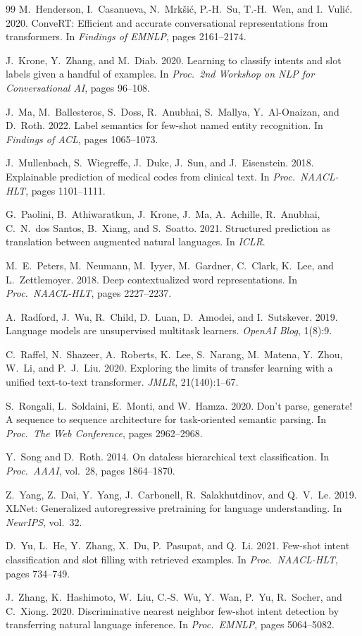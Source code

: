 \documentclass[11pt]{article}
\begin{document}
\begin{thebibliography}{99}
 M.~Henderson, I.~Casanueva, N.~Mrk\v{s}i\'c,
P.-H.~Su, T.-H.~Wen, and I.~Vuli\'c. 2020. ConveRT: Efficient and accurate
conversational representations from transformers. In \emph{Findings of
EMNLP}, pages 2161--2174.

 J.~Krone, Y.~Zhang, and M.~Diab. 2020. Learning to
classify intents and slot labels given a handful of examples. In \emph{Proc.\
2nd Workshop on NLP for Conversational AI}, pages 96--108.

 J.~Ma, M.~Ballesteros, S.~Doss, R.~Anubhai, S.~Mallya,
Y.~Al-Onaizan, and D.~Roth. 2022. Label semantics for few-shot named entity
recognition. In \emph{Findings of ACL}, pages 1065--1073.

 J.~Mullenbach, S.~Wiegreffe, J.~Duke, J.~Sun, and
J.~Eisenstein. 2018. Explainable prediction of medical codes from clinical
text. In \emph{Proc.\ NAACL-HLT}, pages 1101--1111.

 G.~Paolini, B.~Athiwaratkun, J.~Krone, J.~Ma,
A.~Achille, R.~Anubhai, C.~N.~dos Santos, B.~Xiang, and S.~Soatto. 2021.
Structured prediction as translation between augmented natural languages. In
\emph{ICLR}.

 M.~E.~Peters, M.~Neumann, M.~Iyyer, M.~Gardner,
C.~Clark, K.~Lee, and L.~Zettlemoyer. 2018. Deep contextualized word
representations. In \emph{Proc.\ NAACL-HLT}, pages 2227--2237.

 A.~Radford, J.~Wu, R.~Child, D.~Luan, D.~Amodei, and
I.~Sutskever. 2019. Language models are unsupervised multitask learners.
\emph{OpenAI Blog}, 1(8):9.

 C.~Raffel, N.~Shazeer, A.~Roberts, K.~Lee, S.~Narang,
M.~Matena, Y.~Zhou, W.~Li, and P.~J.~Liu. 2020. Exploring the limits of
transfer learning with a unified text-to-text transformer. \emph{JMLR},
21(140):1--67.

 S.~Rongali, L.~Soldaini, E.~Monti, and W.~Hamza. 2020.
Don't parse, generate! A sequence to sequence architecture for task-oriented
semantic parsing. In \emph{Proc.\ The Web Conference}, pages 2962--2968.

 Y.~Song and D.~Roth. 2014. On dataless hierarchical text
classification. In \emph{Proc.\ AAAI}, vol.\ 28, pages 1864--1870.

 Z.~Yang, Z.~Dai, Y.~Yang, J.~Carbonell, R.~Salakhutdinov,
and Q.~V.~Le. 2019. XLNet: Generalized autoregressive pretraining for
language understanding. In \emph{NeurIPS}, vol.\ 32.

 D.~Yu, L.~He, Y.~Zhang, X.~Du, P.~Pasupat, and Q.~Li. 2021.
Few-shot intent classification and slot filling with retrieved examples. In
\emph{Proc.\ NAACL-HLT}, pages 734--749.

 J.~Zhang, K.~Hashimoto, W.~Liu, C.-S.~Wu, Y.~Wan, P.~Yu,
R.~Socher, and C.~Xiong. 2020. Discriminative nearest neighbor few-shot
intent detection by transferring natural language inference. In \emph{Proc.\
EMNLP}, pages 5064--5082.

\end{thebibliography}
\end{document}

